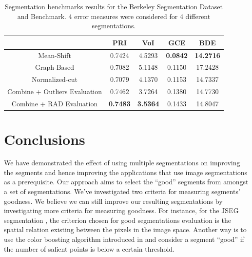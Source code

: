 \documentclass{llncs}
\begin{document}
\begin{table}[!t]
\centering
\begin{tabular}
{|c||c|c|c|c|}
\hline
                              & PRI             & VoI             & GCE             & BDE              \\\hline
Mean-Shift                    & 0.7424          & 4.5293          & \textbf{0.0842} & \textbf{14.2716} \\\hline
Graph-Based                   & 0.7082          & 5.1148          & 0.1150          & 17.2428          \\\hline
Normalized-cut                & 0.7079          & 4.1370          & 0.1153          & 14.7337          \\\hline
Combine + Outliers Evaluation & 0.7462          & 3.7264          & 0.1380          & 14.7730          \\\hline
Combine + RAD Evaluation      & \textbf{0.7483} & \textbf{3.5364} & 0.1433          & 14.8047          \\\hline
\end{tabular}
\caption{Segmentation benchmarks results for the Berkeley Segmentation Dataset and
Benchmark. 4 error measures were considered for 4 different segmentations.}\label{tab:seg_bench}
\end{table}

\section{Conclusions}

We have demonstrated the effect of using multiple segmentations on improving the segments and hence
improving the applications that use image segmentations as a prerequisite. Our approach aims to select
the ``good'' segments from amongst a set of segmentations. We've investigated two criteria for measuring segments' goodness.
We believe we can still improve our resulting segmentations by investigating more criteria for measuring goodness.
For instance, for the JSEG segmentation \cite{jseg:462311}, the criterion chosen for good segmentations evaluation is the spatial relation existing
between the pixels in the image space. Another way is to use the color boosting algorithm introduced in
\cite{Weijer05boostingcolor} and consider a segment ``good'' if the number of salient points is below a certain threshold.



\end{document}
